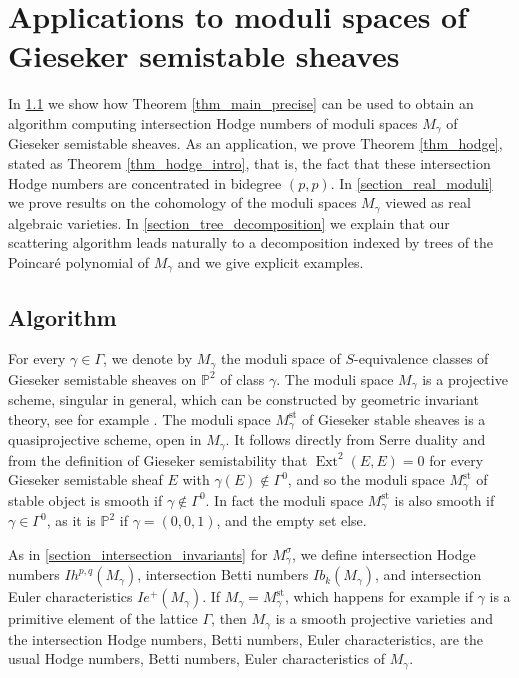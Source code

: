 \documentclass[12pt, a4paper]{amsart}
\newcommand\PP{\mathbb P}
\newcommand\Ext{\operatorname{Ext}}
\newcommand\st{\mathrm{st}}
\begin{document}
\section{Applications to moduli spaces of Gieseker semistable sheaves}
\label{section_application_gieseker}
In \cref{section_algorithm} we show how Theorem \ref{thm_main_precise} can be used to obtain an algorithm
computing intersection Hodge numbers of moduli spaces $M_\gamma$ of Gieseker semistable sheaves.
As an application, we prove Theorem 
\ref{thm_hodge}, stated as Theorem 
\ref{thm_hodge_intro}, that is, 
the fact that these intersection Hodge 
numbers are concentrated in bidegree $(p,p)$. In \cref{section_real_moduli} we prove results on the cohomology of the moduli spaces $M_\gamma$ viewed as real algebraic varieties.
In \cref{section_tree_decomposition} we explain that our scattering algorithm leads naturally to a decomposition indexed by trees of the Poincar\'e polynomial of $M_\gamma$ and we give explicit examples.

\subsection{Algorithm}
\label{section_algorithm}
 
For every $\gamma \in \Gamma$, we denote by
$M_\gamma$ the moduli space of $S$-equivalence classes of Gieseker semistable sheaves on 
$\PP^2$ of class $\gamma$. 
The moduli space $M_\gamma$ is a projective scheme, singular in general, which 
can be constructed by geometric invariant theory, see for example \cite{huybrechts2010geometry}.
The moduli space $M_\gamma^\st$ of Gieseker stable sheaves is a quasiprojective scheme, open in 
$M_\gamma$. It follows directly from Serre duality and from the definition
of Gieseker semistability that $\Ext^2(E,E)=0$ for every Gieseker semistable sheaf $E$
with $\gamma(E) \notin \Gamma^0$, and so the moduli space $M_\gamma^\st$ of stable object is smooth
if $\gamma \notin \Gamma^0$. In fact the moduli space $M_\gamma^\st$ is also smooth if 
$\gamma \in \Gamma^0$, as it is $\PP^2$ if $\gamma=(0,0,1)$, and the empty set else.

As in  \cref{section_intersection_invariants} for $M_\gamma^\sigma$,
we define intersection Hodge numbers $Ih^{p,q}(M_\gamma)$, 
intersection Betti numbers $Ib_k(M_\gamma)$, and intersection Euler characteristics
$Ie^+(M_\gamma)$. If $M_\gamma=M_\gamma^{\st}$, which happens for example if 
$\gamma$ is a primitive element of the lattice $\Gamma$, then $M_\gamma$
is a smooth projective varieties and the intersection Hodge numbers, Betti numbers,
Euler characteristics, are the usual Hodge numbers, Betti numbers, Euler characteristics
of $M_\gamma$. 
\end{document}
